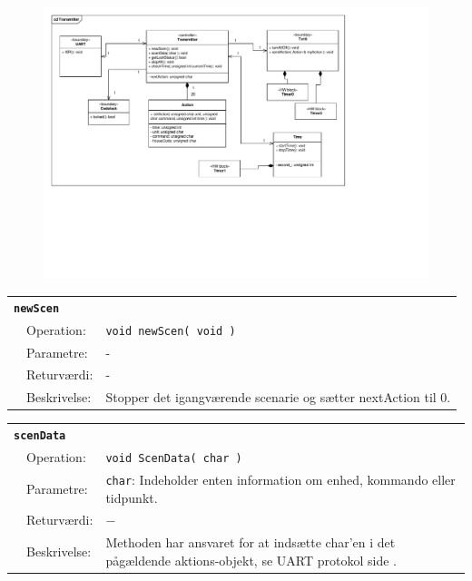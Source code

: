 \begin{figure}[h]
\centering
\includegraphics[scale=1,clip=true, trim=225 429 437 50]{Systemarkitektur/diagrammer/Transmitter_Klassediagram} %
\end{figure}

\begin{table}[h]
\begin{tabularx}{\textwidth}{p{0.6 cm} l X} %
\multicolumn{3}{l}{\textbf{\texttt{newScen}}}\\
& Operation: &
\texttt{void newScen( void )}
\\ & Parametre: & %
-
\\ & Returværdi: & %
-
\\ & Beskrivelse: & %
Stopper det igangværende scenarie og sætter nextAction til 0.
\\ \end{tabularx}
\end{table}

\begin{table}[h]
\begin{tabularx}{\textwidth}{p{0.6 cm} l X} %
\multicolumn{3}{l}{\textbf{\texttt{scenData}}}\\
& Operation: &
\texttt{void ScenData( char )}
\\ & Parametre: & %
\texttt{char}: Indeholder enten information om enhed, kommando eller tidpunkt.
\\ & Returværdi: & %
$-$
\\ & Beskrivelse: & %
Methoden har ansvaret for at indsætte char'en i det pågældende aktions-objekt, se UART protokol side \pageref{prot_UART}.
\\ \end{tabularx}
\end{table}


